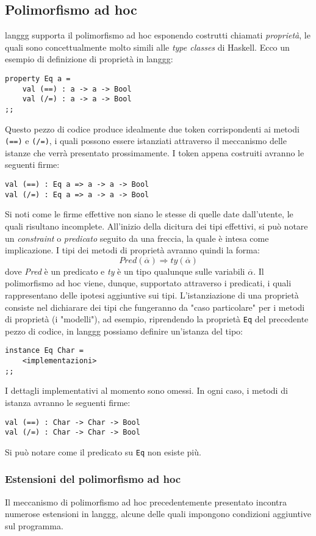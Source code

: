 \documentclass[10pt,a4paper]{article}
\begin{document}
\subsection{Polimorfismo ad hoc}
langgg supporta il polimorfismo ad hoc esponendo costrutti chiamati \textit{proprietà}, le quali sono concettualmente
molto simili alle \textit{type classes} di Haskell. Ecco un esempio di definizione di proprietà in langgg:
\begin{lstlisting}
property Eq a =
    val (==) : a -> a -> Bool
    val (/=) : a -> a -> Bool
;;
\end{lstlisting}
Questo pezzo di codice produce idealmente due token corrispondenti ai metodi \texttt{(==)} e \texttt{(/=)},
i quali possono essere istanziati attraverso il meccanismo delle istanze che verrà presentato prossimamente. I token
appena costruiti avranno le seguenti firme:
\begin{lstlisting}
val (==) : Eq a => a -> a -> Bool
val (/=) : Eq a => a -> a -> Bool
\end{lstlisting}
Si noti come le firme effettive non siano le stesse di quelle date dall'utente, le quali risultano incomplete.
All'inizio della dicitura dei tipi effettivi, si può notare un \textit{constraint} o \textit{predicato} seguito da una
freccia, la quale è intesa come implicazione. I tipi dei metodi di proprietà avranno quindi la forma:
    \[ Pred(\overline{\alpha}) \Rightarrow ty(\overline{\alpha}) \]
dove \textit{Pred} è un predicato e \textit{ty} è un tipo qualunque sulle variabili $ \overline{\alpha} $.
Il polimorfismo ad hoc viene, dunque, supportato attraverso i predicati, i quali rappresentano delle ipotesi aggiuntive
sui tipi. L'istanziazione di una proprietà consiste nel dichiarare dei tipi che fungeranno da "caso particolare" per i
metodi di proprietà (i "modelli"), ad esempio, riprendendo la proprietà \texttt{Eq} del precedente pezzo di codice,
in langgg possiamo definire un'istanza del tipo:
\begin{lstlisting}
instance Eq Char =
    <implementazioni>
;;
\end{lstlisting}
I dettagli implementativi al momento sono omessi. In ogni caso, i metodi di istanza avranno le seguenti firme:
\begin{lstlisting}
val (==) : Char -> Char -> Bool
val (/=) : Char -> Char -> Bool
\end{lstlisting}
Si può notare come il predicato su \texttt{Eq} non esiste più.

\subsubsection{Estensioni del polimorfismo ad hoc}
Il meccanismo di polimorfismo ad hoc precedentemente presentato incontra numerose estensioni in langgg, alcune delle
quali impongono condizioni aggiuntive sul programma.
\end{document}
